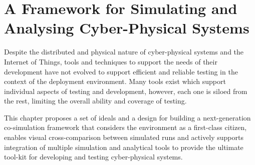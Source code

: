 \chapter{A Framework for Simulating and Analysing Cyber-Physical Systems}






Despite the distributed and physical nature of cyber-physical systems and the Internet of Things, tools and techniques to support the needs of their development have not evolved to support efficient and reliable testing in the context of the deployment environment. Many tools exist which support individual aspects of testing and development, however, each one is siloed from the rest, limiting the overall ability and coverage of testing.

This chapter proposes a set of ideals and a design for building a next-generation co-simulation framework that considers the environment as a first-class citizen, enables visual cross-comparison between simulated runs and actively supports integration of multiple simulation and analytical tools to provide the ultimate tool-kit for developing and testing cyber-physical systems.



